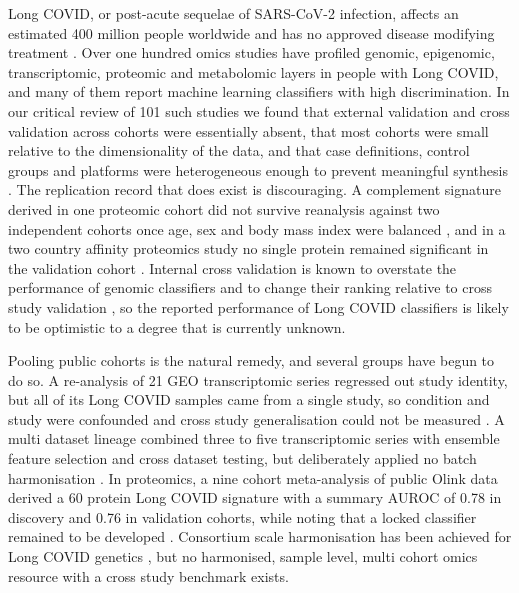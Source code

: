 \documentclass[unnumsec,webpdf,contemporary,large]{oup-authoring-template}
\begin{document}
Long COVID, or post-acute sequelae of SARS-CoV-2 infection, affects an estimated 400 million people worldwide and has no approved disease modifying treatment \citep{pinero2025review}. Over one hundred omics studies have profiled genomic, epigenomic, transcriptomic, proteomic and metabolomic layers in people with Long COVID, and many of them report machine learning classifiers with high discrimination. In our critical review of 101 such studies we found that external validation and cross validation across cohorts were essentially absent, that most cohorts were small relative to the dimensionality of the data, and that case definitions, control groups and platforms were heterogeneous enough to prevent meaningful synthesis \citep{pinero2025review}. The replication record that does exist is discouraging. A complement signature derived in one proteomic cohort did not survive reanalysis against two independent cohorts once age, sex and body mass index were balanced \citep{farztdinov2024}, and in a two country affinity proteomics study no single protein remained significant in the validation cohort \citep{gao2025}. Internal cross validation is known to overstate the performance of genomic classifiers and to change their ranking relative to cross study validation \citep{bernau2014}, so the reported performance of Long COVID classifiers is likely to be optimistic to a degree that is currently unknown.

Pooling public cohorts is the natural remedy, and several groups have begun to do so. A re-analysis of 21 GEO transcriptomic series regressed out study identity, but all of its Long COVID samples came from a single study, so condition and study were confounded and cross study generalisation could not be measured \citep{maison2025}. A multi dataset lineage combined three to five transcriptomic series with ensemble feature selection and cross dataset testing, but deliberately applied no batch harmonisation \citep{varga2026}. In proteomics, a nine cohort meta-analysis of public Olink data derived a 60 protein Long COVID signature with a summary AUROC of 0.78 in discovery and 0.76 in validation cohorts, while noting that a locked classifier remained to be developed \citep{maestri2025}. Consortium scale harmonisation has been achieved for Long COVID genetics \citep{lammi2025}, but no harmonised, sample level, multi cohort omics resource with a cross study benchmark exists.
\end{document}
